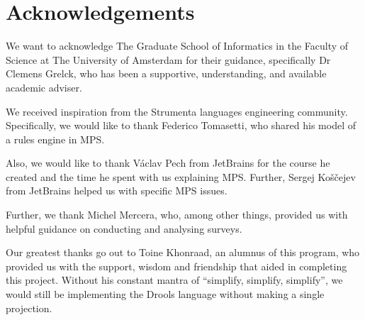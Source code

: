 \chapter*{Acknowledgements}

We want to acknowledge The Graduate School of Informatics in the Faculty of Science at The University of Amsterdam for their guidance, specifically Dr Clemens Grelck, who has been a supportive, understanding, and available academic adviser.


We received inspiration from the Strumenta languages engineering community.
Specifically, we would like to thank Federico Tomasetti, who shared his model of a rules engine in MPS.


Also, we would like to thank Václav Pech from JetBrains for the course he created and the time he spent with us explaining MPS.
Further, Sergej Koščejev from JetBrains helped us with specific MPS issues.


Further, we thank Michel Mercera, who, among other things, provided us with helpful guidance on conducting and analysing surveys.


Our greatest thanks go out to Toine Khonraad, an alumnus of this program, who provided us with the support, wisdom and friendship that aided in completing this project.
Without his constant mantra of ``simplify, simplify, simplify'', we would still be implementing the Drools language without making a single projection.

